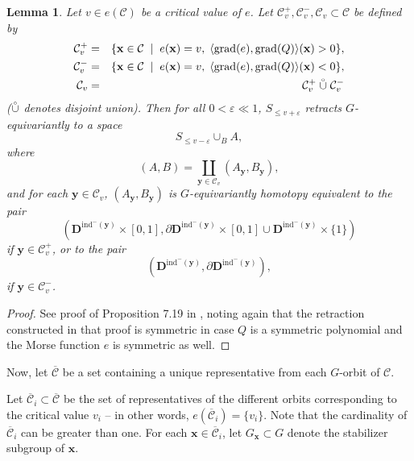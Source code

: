 \documentclass{amsart}
\newtheorem{lemma}{Lemma}
\theoremstyle{definition}
\theoremstyle{remark}
\numberwithin{equation}{section}
\begin{document}
\begin{lemma}
 \label{lem:equivariant_morseB}
Let $v \in e(\mathcal{C})$ be a critical value of $e$.
Let $\mathcal{C}_v^+,\mathcal{C}_v^- , \mathcal{C}_v \subset \mathcal{C}$ be defined by
\begin{eqnarray*}
\mathcal{C}_v^+ &=& \{{\mathbf{x}} \in \mathcal{C}\;\mid \; e({\mathbf{x}}) =v, \;\langle {\mathrm{grad}}(e), {\mathrm{grad}}(Q)\rangle({\mathbf{x}})  >0 \}, \\
\mathcal{C}_v^- &=& \{{\mathbf{x}} \in \mathcal{C}\;\mid \; e({\mathbf{x}}) =v, \;\langle {\mathrm{grad}}(e), {\mathrm{grad}}(Q)\rangle({\mathbf{x}})  <0 \}, \\
\mathcal{C}_v &=& \mathcal{C}_v^+ \;\accentset{\circ}{\cup}\;  \mathcal{C}_v^-
\end{eqnarray*}
($\accentset{\circ}{\cup}$ denotes disjoint union).
  Then for all $0 < {{\varepsilon}} \ll 1$, $S_{\leq v+{{\varepsilon}}}$ retracts
  $G$-equivariantly to a space 
  \[
  S_{\leq v-{{\varepsilon}}} \cup_{B} A,
  \]
  where  
  \[(A,B) = \coprod_{{\mathbf{y}} \in \mathcal{C}_v} ( A_{\mathbf{y}} ,B_{\mathbf{y}}),
  \]
  and for each ${\mathbf{y}} \in \mathcal{C}_v$,  $(A_{\mathbf{y}} ,B_{\mathbf{y}})$ is $G$-equivariantly homotopy equivalent to the pair 
   \[(
  \mathbf{D}^{{\mathrm{ind}}^-({\mathbf{y}})} \times [ 0,1 ] , \partial \mathbf{D}^{{\mathrm{ind}}^-({\mathbf{y}})} \times [ 0,1 ] \cup
  \mathbf{D}^{{\mathrm{ind}}^-({\mathbf{y}})} \times \{ 1 \})
  \]
  if ${\mathbf{y}} \in \mathcal{C}_v^+$,
  or to the pair 
  \[
  (\mathbf{D}^{{\mathrm{ind}}^{-} ({\mathbf{y}})} , \partial \mathbf{D}^{{\mathrm{ind}}^{-} ({\mathbf{y}})}),
  \]
  if ${\mathbf{y}} \in \mathcal{C}_v^-$.
\end{lemma}
\begin{proof}
See proof of Proposition 7.19 in \cite{BPRbook2}, noting again that the retraction constructed in that proof is symmetric in case $Q$ is a symmetric polynomial and the Morse function $e$ is symmetric as well. 
\end{proof}

Now, let $\overline{\mathcal{C}}$ be a set containing a unique representative from 
each $G$-orbit of $\mathcal{C}$.
 
Let $\overline{\mathcal{C}}_i\subset \overline{\mathcal{C}}$ be the set of representatives of the different orbits corresponding to the critical value $v_i$ -- in other words, 
$e(\overline{\mathcal{C}}_i) =\{v_i\}$. 
Note that the cardinality of $\overline{\mathcal{C}}_i$ can be greater than one.
For each ${\mathbf{x}} \in \overline{\mathcal{C}}_i$, let $G_{\mathbf{x}} \subset G$ 
denote the stabilizer subgroup of ${\mathbf{x}}$.
\end{document}
